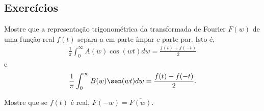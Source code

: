 \subsection*{Exercícios}
\begin{exer}Mostre que a representação trigonométrica da transformada de Fourier $F(w)$ de uma função real $f(t)$ separa-a em parte ímpar e parte par. Isto é,
\begin{eqnarray*}
\frac{1}{\pi}\int_{0}^\infty A(w)\cos(wt)dw=\frac{f(t)+f(-t)}{2}
\end{eqnarray*}
e
\begin{eqnarray*}
\frac{1}{\pi}\int_{0}^\infty B(w)\sen(wt)dw=\frac{f(t)-f(-t)}{2}.
\end{eqnarray*}
\end{exer}
\begin{exer}Mostre que se $f(t)$ é real, $F(-w)=\overline{F(w)}$.
\end{exer}

